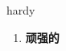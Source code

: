 
\begin{frame}
{\huge hardy}
\begin{center}
\begin{enumerate}\Large
  \item \textbf{顽强的}
\end{enumerate}
\end{center}
\end{frame}
